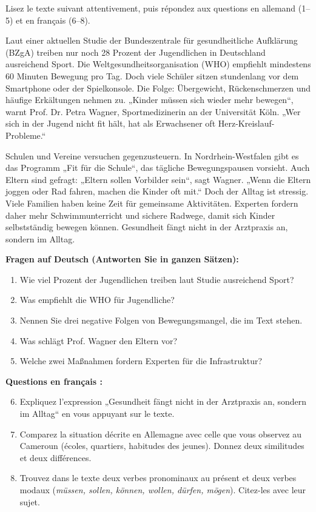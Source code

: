 \documentclass[11pt]{article}
\newcounter{popsec}
\newcounter{popsub}
\newcommand{\courssub}[1]{%
  \stepcounter{popsub}%
  \par\vspace{9pt}\noindent{\popxbold\fontsize{11.5}{13}\selectfont\color{popink}{\color{poporange}\thepopsec.\thepopsub}\hspace{6pt}#1}\par\nopagebreak\vspace{4pt}
}
\begin{document}
\courssub{Préparation au Baccalauréat}

\begin{exercice}
Lisez le texte suivant attentivement, puis répondez aux questions en allemand (1--5) et en français (6--8).

\begin{textebox}
Laut einer aktuellen Studie der Bundeszentrale für gesundheitliche Aufklärung (BZgA) treiben nur noch 28 Prozent der Jugendlichen in Deutschland ausreichend Sport. Die Weltgesundheitsorganisation (WHO) empfiehlt mindestens 60 Minuten Bewegung pro Tag. Doch viele Schüler sitzen stundenlang vor dem Smartphone oder der Spielkonsole. Die Folge: Übergewicht, Rückenschmerzen und häufige Erkältungen nehmen zu. „Kinder müssen sich wieder mehr bewegen“, warnt Prof. Dr. Petra Wagner, Sportmedizinerin an der Universität Köln. „Wer sich in der Jugend nicht fit hält, hat als Erwachsener oft Herz-Kreislauf-Probleme.“

Schulen und Vereine versuchen gegenzusteuern. In Nordrhein-Westfalen gibt es das Programm „Fit für die Schule“, das tägliche Bewegungspausen vorsieht. Auch Eltern sind gefragt: „Eltern sollen Vorbilder sein“, sagt Wagner. „Wenn die Eltern joggen oder Rad fahren, machen die Kinder oft mit.“ Doch der Alltag ist stressig. Viele Familien haben keine Zeit für gemeinsame Aktivitäten. Experten fordern daher mehr Schwimmunterricht und sichere Radwege, damit sich Kinder selbstständig bewegen können. Gesundheit fängt nicht in der Arztpraxis an, sondern im Alltag.
\end{textebox}

\textbf{Fragen auf Deutsch (Antworten Sie in ganzen Sätzen):}
\begin{enumerate}
    \item Wie viel Prozent der Jugendlichen treiben laut Studie ausreichend Sport?
    \item Was empfiehlt die WHO für Jugendliche?
    \item Nennen Sie drei negative Folgen von Bewegungsmangel, die im Text stehen.
    \item Was schlägt Prof. Wagner den Eltern vor?
    \item Welche zwei Maßnahmen fordern Experten für die Infrastruktur?
\end{enumerate}

\textbf{Questions en français :}
\begin{enumerate}
    \setcounter{enumi}{5}
    \item Expliquez l'expression „Gesundheit fängt nicht in der Arztpraxis an, sondern im Alltag“ en vous appuyant sur le texte.
    \item Comparez la situation décrite en Allemagne avec celle que vous observez au Cameroun (écoles, quartiers, habitudes des jeunes). Donnez deux similitudes et deux différences.
    \item Trouvez dans le texte deux verbes pronominaux au présent et deux verbes modaux (\textit{müssen, sollen, können, wollen, dürfen, mögen}). Citez-les avec leur sujet.
\end{enumerate}
\end{exercice}
\end{document}
